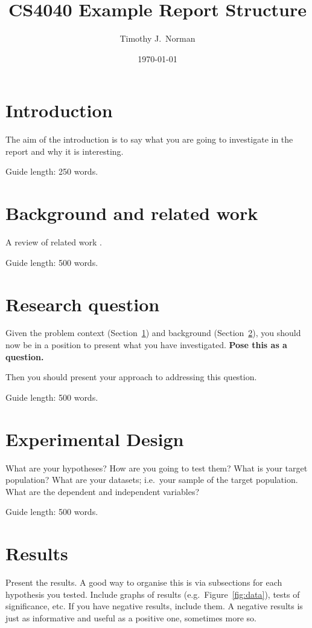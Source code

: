 \documentclass{csfourzero}
\title{CS4040 Example Report Structure}
\author{Timothy J.\ Norman}
\date{\today}
\begin{document}
\maketitle

\section{Introduction}
\label{sec:intro}

The aim of the introduction is to say what you are going to investigate in the report and why it
  is interesting.

Guide length: 250 words.

\section{Background and related work}
\label{sec:lit}

A review of related work \cite{Stallings2010,cryptowiki}.

Guide length: 500 words.

\section{Research question}
\label{sec:rq}

Given the problem context (Section~\ref{sec:intro}) and background
(Section~\ref{sec:lit}), you should now be in a position to present
what you have investigated. \textbf{Pose this as a question.}

Then you should present your approach to addressing this
question.

Guide length: 500 words.

\section{Experimental Design}
\label{sec:exp}

What are your hypotheses? How are you going to test them? What is your
target population? What are your datasets; i.e.\ your sample of the
target population. What are the dependent and independent variables?

Guide length: 500 words.

\section{Results}
\label{sec:results}

Present the results. A good way to organise this is via subsections
for each hypothesis you tested. Include graphs of results
(e.g.\ Figure~\ref{fig:data}), tests of significance, etc. If you have
negative results, include them. A negative results is just as
informative and useful as a positive one, sometimes more so.
\end{document}
